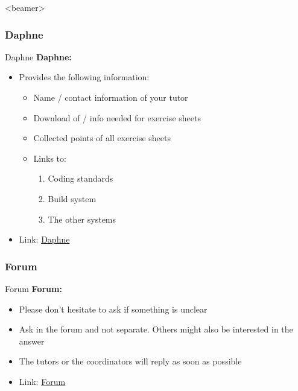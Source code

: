 \begin{frame}<beamer>{\LectureToC}
  \tableofcontents[currentsection, currentsubsection,
    subsubsectionstyle=show/show/shaded
  ]
\end{frame}

\subsubsection{Daphne}

\begin{frame}{Daphne}
  \textbf{Daphne:}
  \begin{itemize}
    \item
      Provides the following information:
      \begin{itemize}
        \item
          Name / contact information of your tutor
        \item
          Download of / info needed for exercise sheets
        \item
          Collected points of all exercise sheets
        \item
          Links to:
          \begin{enumerate}
            \item
              Coding standards
            \item
              Build system
            \item
              The other systems
          \end{enumerate}
      \end{itemize}
    \item
      Link: {\color{MainA}\href{\LectureDaphneLink}{Daphne}}
  \end{itemize}
\end{frame}


\subsubsection{Forum}
\begin{frame}{Forum}
  \textbf{Forum:}
  \begin{itemize}
    \item
      Please don't hesitate to ask if something is unclear
    \item
      Ask in the forum and not separate.
      Others might also be interested in the answer
    \item
      {The \color{MainA}tutors}
      {or the \color{MainA}coordinators} will reply as soon as possible
    \item
      Link: {\color{MainA}\href{\LectureForumLink}{Forum}}
  \end{itemize}
\end{frame}

